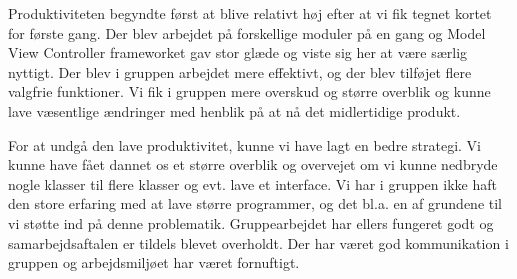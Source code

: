 Produktiviteten begyndte først at blive relativt høj efter at vi fik tegnet kortet for første gang. Der blev arbejdet på forskellige moduler på en gang og Model View Controller frameworket gav stor glæde og viste sig her at være særlig nyttigt. Der blev i gruppen arbejdet mere effektivt, og der blev tilføjet flere valgfrie funktioner. Vi fik i gruppen mere overskud og større overblik og kunne lave væsentlige ændringer med henblik på at nå det midlertidige produkt. 

For at undgå den lave produktivitet, kunne vi have lagt en bedre strategi. Vi kunne have fået dannet os et større overblik og overvejet om vi kunne nedbryde nogle klasser til flere klasser og evt. lave et interface. Vi har i gruppen ikke haft den store erfaring med at lave større programmer, og det bl.a. en af grundene til vi støtte ind på denne problematik. Gruppearbejdet har ellers fungeret godt og samarbejdsaftalen er tildels blevet overholdt. Der har været god kommunikation i gruppen og arbejdsmiljøet har været fornuftigt. 